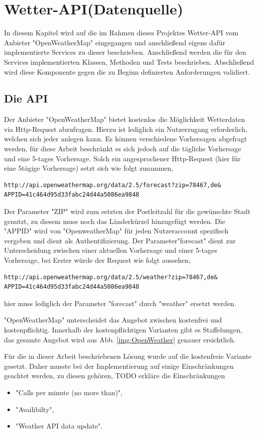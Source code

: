 \section{Wetter-API(Datenquelle)}
In diesem Kapitel wird auf die im Rahmen dieses Projektes Wetter-API vom Anbieter "OpenWeatherMap" eingegangen und anschließend eigens dafür implementierte Services zu dieser beschrieben. Anschließend werden die für den Services implementierten Klassen, Methoden und Tests beschrieben. Abschließend wird diese Komponente gegen die zu Beginn definierten Anforderungen validiert. 
\subsection{Die API}
Der Anbieter "OpenWeatherMap" bietet kostenlos die Möglichkeit Wetterdaten via Http-Request abzufragen. 
Hierzu ist lediglich ein Nutzerzugang erforderlich, welchen sich jeder anlegen kann. Es können verschiedene Vorhersagen abgefragt werden, für diese Arbeit beschränkt es sich jedoch auf die tägliche Vorhersage und eine  5-tages Vorhersage. Solch ein angesprochener Http-Request (hier für eine 5tägige Vorhersage) setzt sich wie folgt zusammen, 
\begin{lstlisting}
http://api.openweathermap.org/data/2.5/forecast?zip=78467,de&
APPID=41c464d95d33fabc24d44a5086ea9848
\end{lstlisting}

Der Parameter "ZIP" wird zum setzten der Postleitzahl für die gewünschte Stadt genutzt, zu diesem muss noch das Länderkürzel hinzugefügt werden. Die "APPID" wird von "OpenweatherMap" für jeden Nutzeraccount spezifisch vergeben und dient als Authentifizierung. Der Parameter"forecast" dient zur Unterscheidung zwischen einer aktuellen Vorhersage und einer 5-tages Vorhersage, bei Erster würde der Request wie folgt aussehen, 

\begin{lstlisting}
http://api.openweathermap.org/data/2.5/weather?zip=78467,de&
APPID=41c464d95d33fabc24d44a5086ea9848
\end{lstlisting}

hier muss lediglich der Parameter "forecast" durch "weather" ersetzt werden. 

"OpenWeatherMap" unterscheidet das Angebot zwischen kostenfrei und kostenpflichtig. Innerhalb der kostenpflichtigen Varianten gibt es Staffelungen, das gesamte Angebot wird aus Abb. \ref{img:OpenWeather} genauer ersichtlich. 

Für die in dieser Arbeit beschriebenen Lösung wurde auf die kostenfreie Variante gesetzt. Daher musste bei der Implementierung auf einige Einschränkungen geachtet werden, zu diesen gehören, 
TODO erkläre die Einschränkungen
\begin{itemize}
\item "Calls per minute (no more than)",
\item "Availibilty",
\item "Weather API data update".
\end{itemize}

